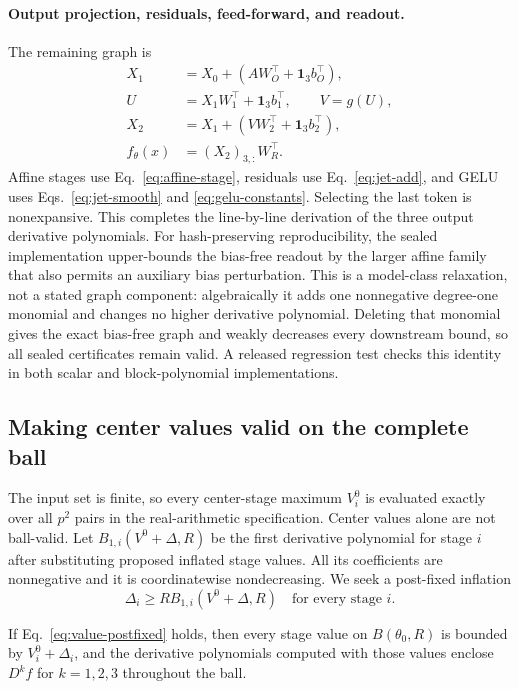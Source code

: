 \paragraph{Output projection, residuals, feed-forward, and readout.}
The remaining graph is
\begin{align}
X_1&=X_0+(AW_O^\top+\mathbf1_3b_O^\top),\nonumber\\
U&=X_1W_1^\top+\mathbf1_3b_1^\top,\qquad V=g(U),\nonumber\\
X_2&=X_1+(VW_2^\top+\mathbf1_3b_2^\top),\nonumber\\
f_\theta(x)&=(X_2)_{3,:}W_R^\top.
\end{align}
Affine stages use Eq.~\eqref{eq:affine-stage}, residuals use
Eq.~\eqref{eq:jet-add}, and GELU uses Eqs.~\eqref{eq:jet-smooth} and
\eqref{eq:gelu-constants}.  Selecting the last token is nonexpansive.  This
completes the line-by-line derivation of the three output derivative
polynomials.  For hash-preserving reproducibility, the sealed implementation
upper-bounds the bias-free readout by the larger affine family that also permits
an auxiliary bias perturbation.  This is a model-class relaxation, not a stated
graph component: algebraically it adds one nonnegative degree-one monomial and
changes no higher derivative polynomial.  Deleting that monomial gives the
exact bias-free graph and weakly decreases every downstream bound, so all
sealed certificates remain valid.  A released regression test checks this
identity in both scalar and block-polynomial implementations.

\subsection{Making center values valid on the complete ball}

The input set is finite, so every center-stage maximum $V_i^0$ is evaluated
exactly over all $p^2$ pairs in the real-arithmetic specification.  Center
values alone are not ball-valid.  Let $B_{1,i}(V^0+\Delta,R)$ be the first
derivative polynomial for stage $i$ after substituting proposed inflated stage
values.  All its coefficients are nonnegative and it is coordinatewise
nondecreasing.  We seek a post-fixed inflation
\begin{equation}
 \Delta_i\ge R B_{1,i}(V^0+\Delta,R)\quad\text{for every stage }i.
 \label{eq:value-postfixed}
\end{equation}

\begin{lemma}
\label{lem:value-chain}
If Eq.~\eqref{eq:value-postfixed} holds, then every stage value on
$B(\theta_0,R)$ is bounded by $V_i^0+\Delta_i$, and the derivative polynomials
computed with those values enclose $D^k f$ for $k=1,2,3$ throughout the ball.
\end{lemma}


